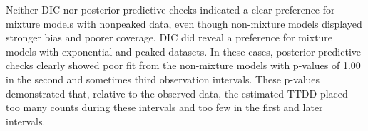 \documentclass[useAMS,usenatbib,referee,12pt]{article}
\begin{document}
Neither DIC nor posterior predictive checks indicated a clear preference for mixture models with nonpeaked data, even though non-mixture models displayed stronger bias and poorer coverage.  DIC did reveal a preference for mixture models with exponential and peaked datasets.  In these cases, posterior predictive checks clearly showed poor fit from the non-mixture models with p-values of 1.00 in the second and sometimes third observation intervals.  These p-values demonstrated that, relative to the observed data, the estimated TTDD placed too many counts during these intervals and too few in the first and later intervals.






\end{document}
